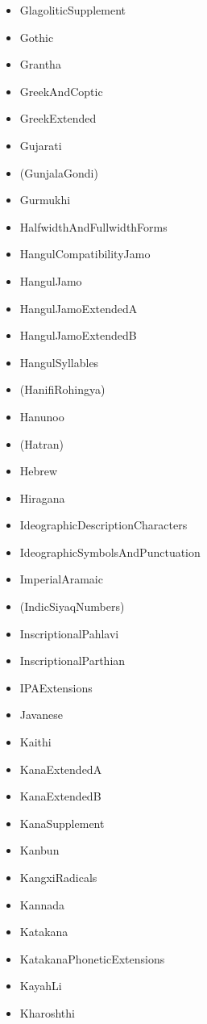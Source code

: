 \documentclass{article}
\newenvironment{itemlist}{%
  \begin{itemize}
  \setlength{\itemsep}{0pt}
  \setlength{\parsep}{0pt}
  \setlength{\topsep}{0pt}
  \setlength{\partopsep}{0pt}
  \setlength{\parskip}{0pt}
  \setlength{\labelsep}{5pt}}%
{
  \end{itemize}}
\begin{document}
\begin{multicols*}{2}
\begin{itemlist}
        \item GlagoliticSupplement
        \item Gothic
        \item Grantha
        \item GreekAndCoptic
        \item GreekExtended
        \item Gujarati
        \item (GunjalaGondi)
        \item Gurmukhi
        \item HalfwidthAndFullwidthForms
        \item HangulCompatibilityJamo
        \item HangulJamo
        \item HangulJamoExtendedA
        \item HangulJamoExtendedB
        \item HangulSyllables
        \item (HanifiRohingya)
        \item Hanunoo
        \item (Hatran)
        \item Hebrew
        \item Hiragana
        \item IdeographicDescriptionCharacters
        \item IdeographicSymbolsAndPunctuation
        \item ImperialAramaic
        \item (IndicSiyaqNumbers)
        \item InscriptionalPahlavi
        \item InscriptionalParthian
        \item IPAExtensions
        \item Javanese
        \item Kaithi
        \item KanaExtendedA
        \item KanaExtendedB
        \item KanaSupplement
        \item Kanbun
        \item KangxiRadicals
        \item Kannada
        \item Katakana
        \item KatakanaPhoneticExtensions
        \item KayahLi
        \item Kharoshthi

\end{itemlist}
\end{multicols*}
\end{document}
